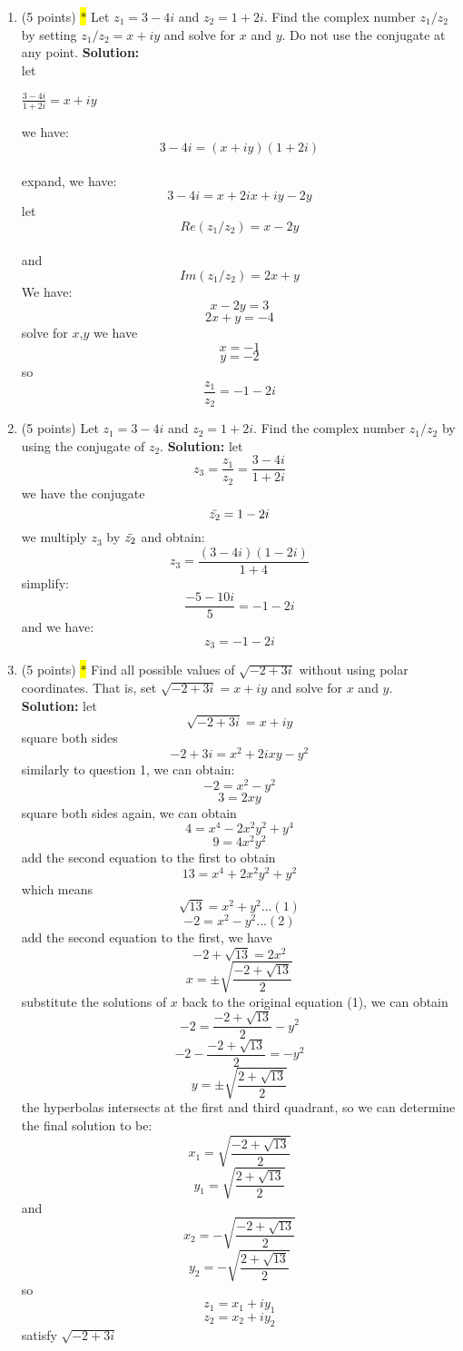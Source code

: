 \documentclass[12pt]{article}
\begin{document}
\begin{enumerate}

\item (5 points) \colorbox{yellow}{$\ast$} Let $z_{1} = 3 -4i$ and $z_{2} = 1 + 2i$.  Find the complex number $z_{1}/z_{2}$ by setting $z_{1}/z_{2} = x + iy$ and solve for $x$ and $y$.  Do not use the conjugate at any point.  
\textbf{Solution:}\\
let


$\frac{3-4i}{1+2i}=x+iy$

we have:\\

\[
3-4i=(x+iy)(1+2i)\]\\
expand, we have:\\

\[3-4i=x+2ix+iy-2y\]
let \[Re(z_1/z_2)=x-2y\] \\
and \[Im(z_1/z_2)=2x+y\]
We have:\\
\[x-2y=3\]
\[2x+y=-4\]
solve for $x$,$y$ we have
\[x=-1\]
\[y=-2\]
so
\[
\frac{z_1}{z_2}=-1-2i
\]
\item (5 points)  Let $z_{1} = 3 -4i$ and $z_{2} = 1 + 2i$.  Find the complex number $z_{1}/z_{2}$ by using the conjugate of $z_{2}$.
\textbf{Solution:}
let\\\[
z_3=\frac{z_1}{z_2}=\frac{3-4i}{1+2i}
\]
we have the conjugate\\
\[\Bar{z_2}=1-2i\]
we multiply $z_3$ by $\Bar{z_2}$ and obtain:
\[
z_3=\frac{(3-4i)(1-2i)}{1+4}
\]
simplify:
\[
\frac{-5-10i}{5}=-1-2i
\]
and we have:
\[z_3=-1-2i\]

\item (5 points)  \colorbox{yellow}{$\ast$} Find all possible values of $\sqrt{-2+3i}$ without using polar coordinates.  That is, set $\sqrt{-2+3i} = x+iy$ and solve for $x$ and $y$.  
\\\textbf{Solution:}
let
\[
\sqrt{-2+3i}=x+iy
\]
square both sides
\[
-2+3i=x^2+2ixy-y^2
\]
similarly to question 1, we can obtain:
\[
-2=x^2-y^2
\]
\[
3=2xy
\]
square both sides again, we can obtain
\[
4=x^4-2x^2y^2+y^4\]
\[
9=4x^2y^2
\]
add the second equation to the first to obtain
\[
13=x^4+2x^2y^2+y^2
\]
which means
\[
\sqrt{13}=x^2+y^2 ... (1)
\]
\[
-2=x^2-y^2 ... (2)
\]
add the second equation to the first, we have
\[
-2+\sqrt{13}=2x^2
\]
\[
x=\pm \sqrt{\frac{-2+\sqrt{13}}{2}}
\]
substitute the solutions of $x$ back to the original equation (1), we can obtain
\[
-2=\frac{-2+\sqrt{13}}{2}-y^2
\]
\[
-2-\frac{-2+\sqrt{13}}{2}=-y^2
\]
\[
y=\pm \sqrt{\frac{2+\sqrt{13}}{2}}
\]
the hyperbolas intersects at the first and third quadrant, so we can determine the final solution to be:
\[
x_1=\sqrt{\frac{-2+\sqrt{13}}{2}}
\]
\[
y_1= \sqrt{\frac{2+\sqrt{13}}{2}}
\]
and
\[
x_2=-\sqrt{\frac{-2+\sqrt{13}}{2}}
\]
\[
y_2= -\sqrt{\frac{2+\sqrt{13}}{2}}
\]
so
\[z_1=x_1+iy_1
\]\[
z_2=x_2+iy_2
\]
satisfy $\sqrt{-2+3i}$


\end{enumerate}
\end{document}
